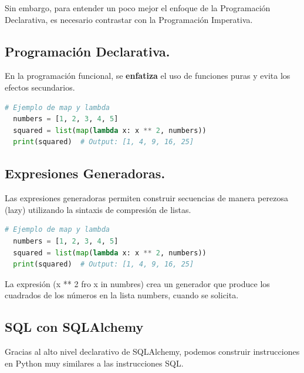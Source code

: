 \documentclass[12pt]{article}
\begin{document}
Sin embargo, para entender un poco mejor el enfoque de la Programación Declarativa, es necesario contrastar con la Programación Imperativa.

\subsection{Programación Declarativa.}
En la programación funcional, se \textbf{enfatiza} el uso de funciones puras y evita los efectos secundarios. 

\begin{lstlisting}[language=Python]
  # Ejemplo de map y lambda
  numbers = [1, 2, 3, 4, 5]
  squared = list(map(lambda x: x ** 2, numbers))
  print(squared)  # Output: [1, 4, 9, 16, 25]
\end{lstlisting}
\vspace{12pt}
\newpage
\subsection{Expresiones Generadoras.}
Las expresiones generadoras permiten construir secuencias de manera perezosa (lazy) utilizando la sintaxis de compresión de listas.

\begin{lstlisting}[language=Python]
  # Ejemplo de map y lambda
  numbers = [1, 2, 3, 4, 5]
  squared = list(map(lambda x: x ** 2, numbers))
  print(squared)  # Output: [1, 4, 9, 16, 25]
\end{lstlisting}
La expresión (x ** 2 fro x in numbres) crea un generador que produce los cuadrados de los números en la lista numbers, cuando se solicita.

\vspace{12pt}

\subsection{SQL con SQLAlchemy}

Gracias al alto nivel declarativo de SQLAlchemy, podemos construir instrucciones en Python muy similares a las instrucciones SQL.
\end{document}
